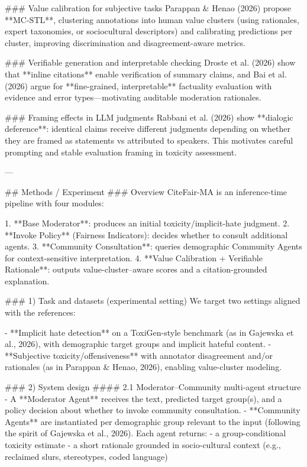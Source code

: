 ### Value calibration for subjective tasks  
Parappan & Henao (2026) propose **MC-STL**, clustering annotations into human value clusters (using rationales, expert taxonomies, or sociocultural descriptors) and calibrating predictions per cluster, improving discrimination and disagreement-aware metrics.

### Verifiable generation and interpretable checking  
Droste et al. (2026) show that **inline citations** enable verification of summary claims, and Bai et al. (2026) argue for **fine-grained, interpretable** factuality evaluation with evidence and error types—motivating auditable moderation rationales.

### Framing effects in LLM judgments  
Rabbani et al. (2026) show **dialogic deference**: identical claims receive different judgments depending on whether they are framed as statements vs attributed to speakers. This motivates careful prompting and stable evaluation framing in toxicity assessment.

---

## Methods / Experiment  
### Overview  
CiteFair-MA is an inference-time pipeline with four modules:

1. **Base Moderator**: produces an initial toxicity/implicit-hate judgment.  
2. **Invoke Policy** (Fairness Indicators): decides whether to consult additional agents.  
3. **Community Consultation**: queries demographic Community Agents for context-sensitive interpretation.  
4. **Value Calibration + Verifiable Rationale**: outputs value-cluster–aware scores and a citation-grounded explanation.

### 1) Task and datasets (experimental setting)  
We target two settings aligned with the references:

- **Implicit hate detection** on a ToxiGen-style benchmark (as in Gajewska et al., 2026), with demographic target groups and implicit hateful content.  
- **Subjective toxicity/offensiveness** with annotator disagreement and/or rationales (as in Parappan & Henao, 2026), enabling value-cluster modeling.

### 2) System design  
#### 2.1 Moderator–Community multi-agent structure  
- A **Moderator Agent** receives the text, predicted target group(s), and a policy decision about whether to invoke community consultation.  
- **Community Agents** are instantiated per demographic group relevant to the input (following the spirit of Gajewska et al., 2026). Each agent returns:
  - a group-conditional toxicity estimate  
  - a short rationale grounded in socio-cultural context (e.g., reclaimed slurs, stereotypes, coded language)

